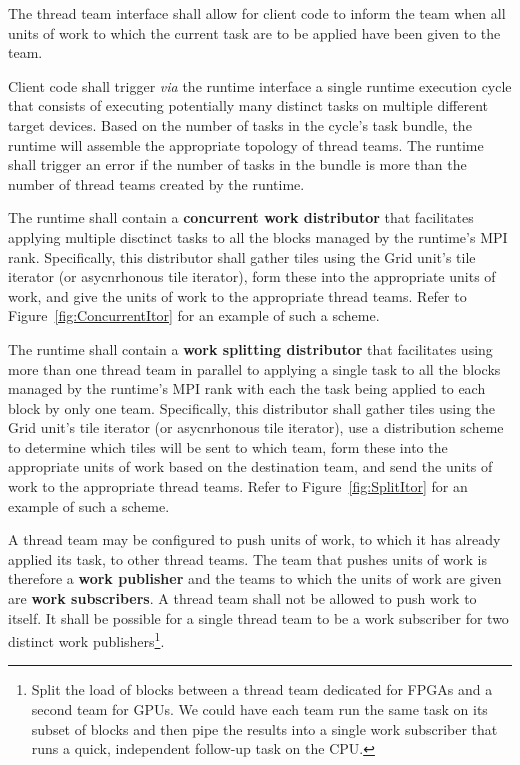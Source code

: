\documentclass{article}
\begin{document}
\begin{req}
The thread team interface shall allow for client code to inform the team when
all units of work to which the current task are to be applied have been given to
the team.
\end{req}

\begin{req}
Client code shall trigger \textit{via} the runtime interface a single runtime
execution cycle that consists of executing potentially many distinct tasks on
multiple different target devices.  Based on the number of tasks in the cycle's
task bundle, the runtime will assemble the appropriate topology of thread teams.
The runtime shall trigger an error if the number of tasks in the bundle is more
than the number of thread teams created by the runtime.
\end{req}

\begin{req}
The runtime shall contain a \textbf{concurrent work distributor} that
facilitates applying multiple disctinct tasks to all the blocks managed by the
runtime's MPI rank.  Specifically, this distributor shall gather tiles using the
Grid unit's tile iterator (or asycnrhonous tile iterator), form these into the
appropriate units of work, and give the units of work to the appropriate thread
teams.  Refer to Figure~\ref{fig:ConcurrentItor} for an example of such a scheme.
\end{req}

\begin{req}
The runtime shall contain a \textbf{work splitting distributor} that facilitates
using more than one thread team in parallel to applying a single task to all the
blocks managed by the runtime's MPI rank with each the task being applied to
each block by only one team.  Specifically, this distributor shall
gather tiles using the Grid unit's tile iterator (or asycnrhonous tile
iterator), use a distribution scheme to determine which tiles will be sent to
which team, form these into the appropriate units of work based on the
destination team, and send the units of work to the appropriate thread teams.
Refer to Figure~\ref{fig:SplitItor} for an example of such a scheme.
\end{req}

\begin{req}
A thread team may be configured to push units of work, to which it has already
applied its task, to other thread teams.  The team that pushes units of work is
therefore a \textbf{work publisher} and the teams to which the units of work are
given are \textbf{work subscribers}.  A thread team shall not be allowed to push
work to itself.  It shall be possible for a single thread team to be a work
subscriber for two distinct work publishers\footnote{Split the load of blocks
between a thread team dedicated for FPGAs and a second team for GPUs.  We could
have each team run the same task on its subset of blocks and then pipe the
results into a single work subscriber that runs a quick, independent follow-up
task on the CPU.}.
\end{req}
\end{document}
